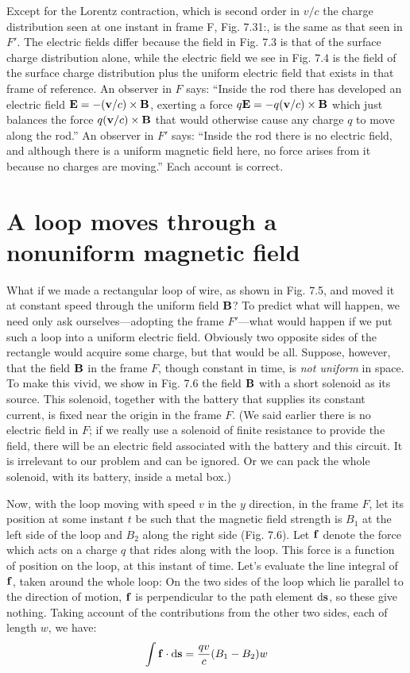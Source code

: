 Except for the Lorentz contraction, which is second order in $v/c$
the charge distribution seen at one instant in frame F, Fig. 7.31:, is the
same as that seen in $F'$. The electric fields differ because the field in
Fig. 7.3 is that of the surface charge distribution alone, while the
electric field we see in Fig. 7.4 is the field of the surface charge
distribution plus the uniform electric field that exists in that frame
of reference. An observer in $F$ says: ``Inside the rod there has developed
an electric field $\mathbf{E} = - (\mathbf{v}/c) \times \mathbf{B}$, exerting a force 
$q\mathbf{E}=-q(\mathbf{v}/c)\times\mathbf{B}$
which just balances the force $q(\mathbf{v}/c) \times \mathbf{B}$ that would
otherwise cause any charge $q$ to move along the rod.'' An observer
in $F'$ says: ``Inside the rod there is no electric field, and although there
is a uniform magnetic field here, no force arises from it because no
charges are moving.'' Each account is correct.

\section{A loop moves through a nonuniform magnetic field}

What if we made a rectangular loop of wire, as shown in Fig. 7.5,
and moved it at constant speed through the uniform field $\mathbf{B}$? To
predict what will happen, we need only ask ourselves---adopting the
frame $F'$---what would happen if we put such a loop into a uniform
electric field. Obviously two opposite sides of the rectangle would
acquire some charge, but that would be all. Suppose, however, that
the field $\mathbf{B}$ in the frame $F$, though constant in time, is \emph{not uniform} in
space. To make this vivid, we show in Fig. 7.6 the field $\mathbf{B}$ with a short
solenoid as its source. This solenoid, together with the battery that
supplies its constant current, is fixed near the origin in the frame $F$.
(We said earlier there is no electric field in $F$; if we really use a
solenoid of finite resistance to provide the field, there will be an electric
field associated with the battery and this circuit. It is irrelevant
to our problem and can be ignored. Or we can pack the whole
solenoid, with its battery, inside a metal box.)

Now, with the loop moving with speed $v$ in the $y$ direction, in the
frame $F$, let its position at some instant $t$ be such that the magnetic
field strength is $B_1$ at the left side of the loop and $B_2$ along the right
side (Fig. 7.6). Let $\mathbf{f}$ denote the force which acts on a charge $q$ that
rides along with the loop. This force is a function of position on the
loop, at this instant of time. Let's evaluate the line integral of $\mathbf{f}$,
taken around the whole loop: On the two sides of the loop which lie
parallel to the direction of motion, $\mathbf{f}$ is perpendicular to the path
element $\textup{d}\mathbf{s}$, so these give nothing. Taking account of the contributions
from the other two sides, each of length $w$, we have:
\begin{equation}
  \int \mathbf{f}\cdot\textup{d}\mathbf{s} = \frac{qv}{c}(B_1-B_2)w
\end{equation}

